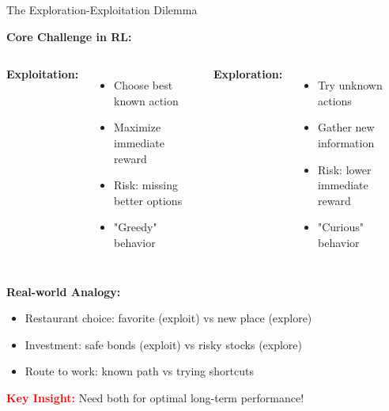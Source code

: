\documentclass[aspectratio=169,10pt]{beamer}
\begin{document}
\begin{frame}{The Exploration-Exploitation Dilemma}

\textbf{Core Challenge in RL:}

\vfill

\begin{columns}[t]
\textbf{Exploitation:}
\begin{itemize}
    \item Choose best known action
    \item Maximize immediate reward
    \item Risk: missing better options
    \item "Greedy" behavior
\end{itemize}

\textbf{Exploration:}
\begin{itemize}
    \item Try unknown actions
    \item Gather new information
    \item Risk: lower immediate reward
    \item "Curious" behavior
\end{itemize}
\end{columns}

\vfill

\textbf{Real-world Analogy:}
\begin{itemize}
    \item Restaurant choice: favorite (exploit) vs new place (explore)
    \item Investment: safe bonds (exploit) vs risky stocks (explore)
    \item Route to work: known path vs trying shortcuts
\end{itemize}

\vfill

\textcolor{red}{\textbf{Key Insight:}} Need both for optimal long-term performance!

\end{frame}
\end{document}
